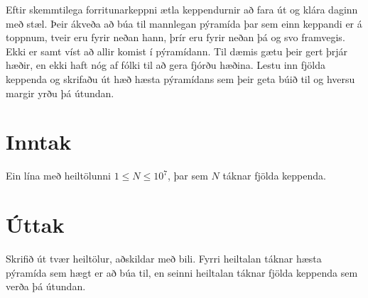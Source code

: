 

Eftir skemmtilega forritunarkeppni ætla keppendurnir að fara út og klára daginn
með stæl. Þeir ákveða að búa til mannlegan pýramída þar sem einn keppandi er á
toppnum, tveir eru fyrir neðan hann, þrír eru fyrir neðan þá og svo framvegis.
Ekki er samt víst að allir komist í pýramídann. Til dæmis gætu þeir gert þrjár
hæðir, en ekki haft nóg af fólki til að gera fjórðu hæðina. Lestu inn fjölda
keppenda og skrifaðu út hæð hæsta pýramídans sem þeir geta búið til og hversu
margir yrðu þá útundan.

\section*{Inntak}
Ein lína með heiltölunni $1 \leq N \leq 10^7$, þar sem $N$ táknar fjölda
keppenda.

\section*{Úttak}
Skrifið út tvær heiltölur, aðskildar með bili. Fyrri heiltalan táknar hæsta
pýramída sem hægt er að búa til, en seinni heiltalan táknar fjölda keppenda sem
verða þá útundan.

